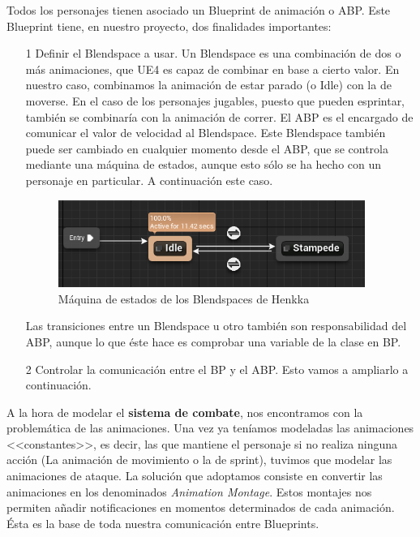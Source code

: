 Todos los personajes tienen asociado un Blueprint de animación o \ac{ABP}. Este Blueprint tiene, en nuestro proyecto, dos finalidades importantes:


\begin{itemize}
\item[1] Definir el Blendspace a usar. Un Blendspace es una combinación de dos o más animaciones, que \ac{UE4} es capaz de combinar en base a cierto valor. En nuestro caso, combinamos la animación de estar parado (o Idle) con la de moverse. En el caso de los personajes jugables, puesto que pueden esprintar, también se combinaría con la animación de correr. El \ac{ABP} es el encargado de comunicar el valor de velocidad al Blendspace. Este Blendspace también puede ser cambiado en cualquier momento desde el \ac{ABP}, que se controla mediante una máquina de estados, aunque esto sólo se ha hecho con un personaje en particular. A continuación este caso.


\begin{figure}[H]
  \centering
  \includegraphics[width=10cm]{./images/Henkka_SM.png}
  \caption{Máquina de estados de los Blendspaces de Henkka}
  \label{HenkkaSM}
\end{figure}


Las transiciones entre un Blendspace u otro también son responsabilidad del \ac{ABP}, aunque lo que éste hace es comprobar una variable de la clase en \ac{BP}.

\item[2] Controlar la comunicación entre el \ac{BP} y el \ac{ABP}. Esto vamos a ampliarlo a continuación.
\end{itemize}


A la hora de modelar el \textbf{sistema de combate}, nos encontramos con la problemática de las animaciones. Una vez ya teníamos modeladas las animaciones <<constantes>>, es decir, las que mantiene el personaje si no realiza ninguna acción (La animación de movimiento o la de sprint), tuvimos que modelar las animaciones de ataque. La solución que adoptamos consiste en convertir las animaciones en los denominados \textit{Animation Montage}. Estos montajes nos permiten añadir notificaciones en momentos determinados de cada animación. Ésta es la base de toda nuestra comunicación entre Blueprints.
\\

